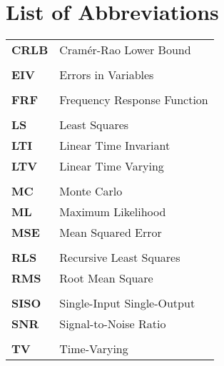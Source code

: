 \chapter*{List of Abbreviations}
\begin{longtable}[c]{>{\raggedleft}p{}>{\raggedright}p{}}
\textbf{CRLB} &   Cram\'er-Rao Lower Bound\tabularnewline
\tabularnewline
\textbf{EIV} &  Errors in Variables\tabularnewline
\tabularnewline
\textbf{FRF} &   Frequency Response Function\tabularnewline
\tabularnewline
\textbf{LS} &  Least Squares\tabularnewline
\textbf{LTI} &  Linear Time Invariant\tabularnewline
\textbf{LTV} &  Linear Time Varying\tabularnewline
\tabularnewline
\textbf{MC} &  Monte Carlo\tabularnewline
\textbf{ML} &  Maximum Likelihood\tabularnewline
\textbf{MSE} &  Mean Squared Error\tabularnewline
\tabularnewline
\textbf{RLS} &  Recursive Least Squares\tabularnewline
\textbf{RMS} &  Root Mean Square \tabularnewline
\tabularnewline
\textbf{SISO} &  Single-Input Single-Output\tabularnewline
\textbf{SNR} &   Signal-to-Noise Ratio\tabularnewline
\tabularnewline
\textbf{TV} &   Time-Varying\tabularnewline

\end{longtable}
